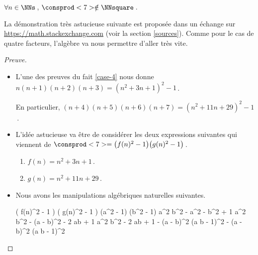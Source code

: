 \begin{fact} \label{case-8}
	 $\forall n \in \NNs$\,, $\consprod<7> \notin \NNsquare$\,.
\end{fact}




La démonstration très astucieuse suivante est proposée dans un échange sur \url{https://math.stackexchange.com} (voir la section \ref{sources}).
Comme pour le cas de quatre facteurs, l'algèbre va nous permettre d'aller très vite.


\begin{proof}[Preuve]
	\leavevmode

	\begin{itemize}
		\item L'une des preuves du fait \ref{case-4} nous donne
		$n (n + 1) (n + 2) (n + 3) = (n^2 + 3n + 1)^2 - 1$\,.

		\smallskip
		\noindent
		En particulier,
		$(n + 4)(n + 5)(n + 6)(n + 7) = (n^2 + 11 n + 29)^2 - 1$\,.


		\item L'idée astucieuse va être de considérer les deux expressions suivantes qui viennent de $\consprod<7> = \big( f(n)^2 - 1 \big) \big( g(n)^2 - 1 \big)$\,.
		\begin{enumerate}
			\item $f(n) = n^2 + 3n + 1$\,.

			\item $g(n) = n^2 + 11 n + 29$\,.
		\end{enumerate}


		\item Nous avons les manipulations algébriques naturelles suivantes.

        \noindent\kern-6pt%
        \begin{stepcalc}[style = sar]
        \explnext{}
        	\big( f(n)^2 - 1 \big) \big( g(n)^2 - 1 \big)
        	(a^2 - 1) (b^2 - 1)
        \explnext{}
        	a^2 b^2 - a^2 - b^2 + 1
        	a^2 b^2 - (a - b)^2 - 2 ab + 1
        \explnext{}
        	a^2 b^2  - 2 ab + 1 - (a - b)^2
        \explnext{}
        	(a b  - 1)^2 - (a - b)^2
        	(a b  - 1)^2
        \end{stepcalc}
        

\end{itemize}
\end{proof}

